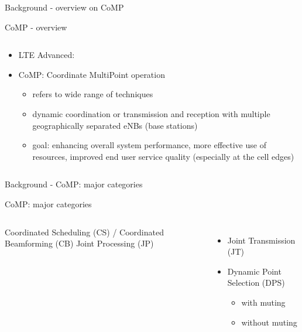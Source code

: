 \documentclass[xcolor={cmyk}]{beamer}
\begin{document}
 
 \begin{frame}{Background - overview on CoMP}
 	\begin{block}{CoMP - overview}
		\begin{columns}
			\begin{column}{.9\textwidth}
				\begin{itemize}
					\item LTE Advanced:
					\item CoMP: Coordinate MultiPoint operation
					\begin{itemize}
						\item refers to wide range of techniques
						\item dynamic coordination or transmission and reception with multiple geographically separated eNBs (base stations)
						\item goal: enhancing overall system performance, more effective use of resources, improved end user service quality (especially at the cell edges)
					\end{itemize}
				\end{itemize}
			\end{column}
		\end{columns}
	 \end{block}
 \end{frame}
 
 \begin{frame}{Background - CoMP: major categories}
 	\begin{block}{CoMP: major categories}
		\begin{columns}
			\column{.5\textwidth}
				Coordinated Scheduling (CS) / Coordinated Beamforming (CB)
			\column{.5\textwidth}
			Joint Processing (JP)
				\begin{itemize}
					\item Joint Transmission (JT)
					\item Dynamic Point Selection (DPS)
					\begin{itemize}
						\item with muting
						\item without muting
					\end{itemize}
				\end{itemize}
		\end{columns}
	 \end{block}
 \end{frame}
 
\end{document}
